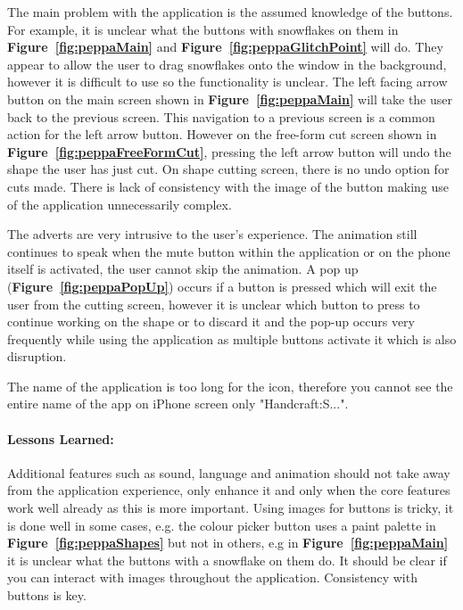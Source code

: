 \documentclass[11pt]{article}
\begin{document}
                The main problem with the application is the assumed knowledge of the buttons. For example, it is unclear what the buttons with snowflakes on them in \textbf{Figure~\ref{fig:peppaMain}} and \textbf{Figure~\ref{fig:peppaGlitchPoint}} will do. They appear to allow the user to drag snowflakes onto the window in the background, however it is difficult to use so the functionality is unclear. The left facing arrow button on the main screen shown in \textbf{Figure~\ref{fig:peppaMain}} will take the user back to the previous screen. This navigation to a previous screen is a common action for the left arrow button. However on the free-form cut screen shown in \textbf{Figure~\ref{fig:peppaFreeFormCut}}, pressing the left arrow button will undo the shape the user has just cut.
                 On shape cutting screen, there is no undo option for cuts made. There is lack of consistency with the image of the button making use of the application unnecessarily complex.
                
                The adverts are very intrusive to the user's experience. The animation still continues to speak when the mute button within the application or on the phone itself is activated, the user cannot skip the animation. A pop up (\textbf{Figure~\ref{fig:peppaPopUp}}) occurs if a button is pressed which will exit the user from the cutting screen, however it is unclear which button to press to continue working on the shape or to discard it and the pop-up occurs very frequently while using the application as multiple buttons activate it which is also disruption. 
                
                The name of the application is too long for the icon, therefore you cannot see the entire name of the app on iPhone screen only "Handcraft:S...".
                
                \paragraph{Lessons Learned:}   
                Additional features such as sound, language and animation should not take away from the application experience, only enhance it and only when the core features work well already as this is more important. Using images for buttons is tricky, it is done well in some cases, e.g. the colour picker button uses a paint palette in \textbf{Figure~\ref{fig:peppaShapes}} but not in others, e.g in \textbf{Figure~\ref{fig:peppaMain}} it is unclear what the buttons with a snowflake on them do. It should be clear if you can interact with images throughout the application. Consistency with buttons is key.
                
\end{document}
